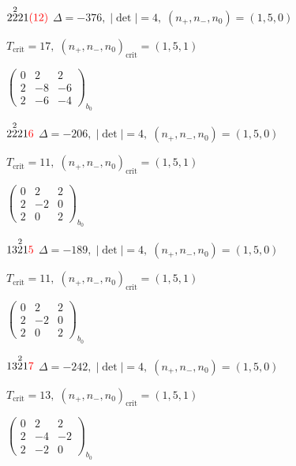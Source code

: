 \documentclass[10pt]{article}
\begin{document}
$2\overset{2}{2}21\textcolor{red}{(12)}$ \quad $\Delta=-376,\; |\det|=4,\; (n_+,n_-,n_0)=(1,5,0)$

\hspace{1em}$T_{\text{crit}}=17,\; (n_+,n_-,n_0)_{\text{crit}}=(1,5,1)$

\hspace{2em}$\left(\begin{smallmatrix}0 & 2 & 2 \\ 2 & -8 & -6 \\ 2 & -6 & -4\end{smallmatrix}\right)_{\!b_0}$

$2\overset{2}{2}21\textcolor{red}{6}$ \quad $\Delta=-206,\; |\det|=4,\; (n_+,n_-,n_0)=(1,5,0)$

\hspace{1em}$T_{\text{crit}}=11,\; (n_+,n_-,n_0)_{\text{crit}}=(1,5,1)$

\hspace{2em}$\left(\begin{smallmatrix}0 & 2 & 2 \\ 2 & -2 & 0 \\ 2 & 0 & 2\end{smallmatrix}\right)_{\!b_0}$

\smallskip

$13\overset{2}{2}1\textcolor{red}{5}$ \quad $\Delta=-189,\; |\det|=4,\; (n_+,n_-,n_0)=(1,5,0)$

\hspace{1em}$T_{\text{crit}}=11,\; (n_+,n_-,n_0)_{\text{crit}}=(1,5,1)$

\hspace{2em}$\left(\begin{smallmatrix}0 & 2 & 2 \\ 2 & -2 & 0 \\ 2 & 0 & 2\end{smallmatrix}\right)_{\!b_0}$

$13\overset{2}{2}1\textcolor{red}{7}$ \quad $\Delta=-242,\; |\det|=4,\; (n_+,n_-,n_0)=(1,5,0)$

\hspace{1em}$T_{\text{crit}}=13,\; (n_+,n_-,n_0)_{\text{crit}}=(1,5,1)$

\hspace{2em}$\left(\begin{smallmatrix}0 & 2 & 2 \\ 2 & -4 & -2 \\ 2 & -2 & 0\end{smallmatrix}\right)_{\!b_0}$
\end{document}
